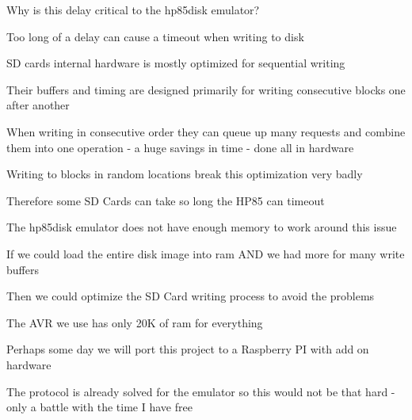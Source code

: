 \begin{DoxyItemize}
\begin{DoxyItemize}
\begin{DoxyItemize}
\begin{DoxyItemize}
\end{DoxyItemize}
\item Why is this delay critical to the hp85disk emulator?
\begin{DoxyItemize}
\item Too long of a delay can cause a timeout when writing to disk
\item SD cards internal hardware is mostly optimized for sequential writing
\begin{DoxyItemize}
\item Their buffers and timing are designed primarily for writing consecutive blocks one after another
\begin{DoxyItemize}
\item When writing in consecutive order they can queue up many requests and combine them into one operation -\/ a huge savings in time -\/ done all in hardware
\item Writing to blocks in random locations break this optimization very badly
\begin{DoxyItemize}
\item Therefore some SD Cards can take so long the H\+P85 can timeout
\end{DoxyItemize}
\end{DoxyItemize}
\item The hp85disk emulator does not have enough memory to work around this issue
\begin{DoxyItemize}
\item If we could load the entire disk image into ram A\+ND we had more for many write buffers
\begin{DoxyItemize}
\item Then we could optimize the SD Card writing process to avoid the problems
\end{DoxyItemize}
\item The A\+VR we use has only 20K of ram for everything
\begin{DoxyItemize}
\item Perhaps some day we will port this project to a Raspberry PI with add on hardware
\begin{DoxyItemize}
\item The protocol is already solved for the emulator so this would not be that hard -\/ only a battle with the time I have free
\end{DoxyItemize}
\end{DoxyItemize}
\end{DoxyItemize}
\end{DoxyItemize}
\end{DoxyItemize}
\end{DoxyItemize}
\end{DoxyItemize}
\end{DoxyItemize}





